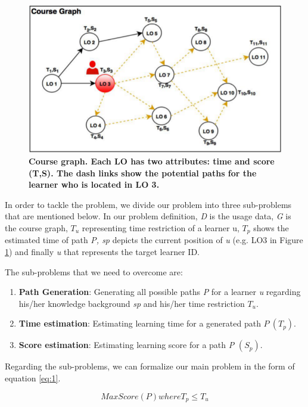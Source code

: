 \documentclass{sig-alternate}
\begin{document}
\begin{figure}[H]
    \centering
\includegraphics[width=0.8\linewidth]{images/figure1.png}
    \caption{\textbf{Course graph. Each LO has two attributes: time
and score (T,S). The dash links show the potential paths for
the learner who is located in LO 3.}}
    \label{fig:f1}
\end{figure}

In order to tackle the problem, we divide our problem into three sub-problems that are mentioned below. In our problem definition, \textit{D} is the usage data, \textit{G} is the course graph, $T_u$ representing time restriction of a learner u, $T_p$ shows the estimated time of path \textit{P, sp} depicts the current position of \textit{u} (e.g. LO3 in Figure \ref{fig:f1}) and finally \textit{u} that represents the target learner ID.

The sub-problems that we need to overcome are:

\begin{enumerate}[noitemsep,label=(\arabic*)]
\item \textbf{Path Generation}: Generating all possible paths \textit{P} for a learner \textit{u} regarding his/her knowledge background \textit{sp} and
his/her time restriction $T_u$.
\item \textbf{Time estimation}: Estimating learning time for a generated path $P\ (T_p)$.
\item \textbf{Score estimation}: Estimating learning score for a path \textit{P} $(S_p)$.
\end{enumerate}

\newpage
Regarding the sub-problems, we can formalize our main problem in the form of equation \ref{eq:1}.

\begin{equation} \label{eq:1}
Max Score (P) where T_p \leq T_u
\end{equation}
\end{document}
